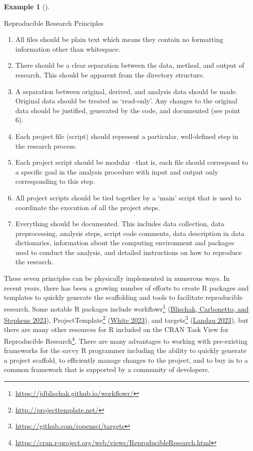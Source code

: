 \documentclass[
  letterpaper,
  DIV=11,
  numbers=noendperiod]{scrreport}
\providecommand{\tightlist}{%
  \setlength{\itemsep}{0pt}\setlength{\parskip}{0pt}}\usepackage{longtable,booktabs,array}
\theoremstyle{definition}
\newtheorem{example}{Example}[chapter]
\theoremstyle{remark}
\DeclareRobustCommand{\href}[2]{#2\footnote{\url{#1}}}
\begin{document}
\begin{example}[]\protect\hypertarget{exm-fr-repro-principles}{}\label{exm-fr-repro-principles}

Reproducible Research Principles

\begin{enumerate}
\def\labelenumi{\arabic{enumi}.}
\tightlist
\item
  All files should be plain text which means they contain no formatting
  information other than whitespace.
\item
  There should be a clear separation between the data, method, and
  output of research. This should be apparent from the directory
  structure.
\item
  A separation between original, derived, and analysis data should be
  made. Original data should be treated as `read-only'. Any changes to
  the original data should be justified, generated by the code, and
  documented (see point 6).
\item
  Each project file (script) should represent a particular, well-defined
  step in the research process.
\item
  Each project script should be modular --that is, each file should
  correspond to a specific goal in the analysis procedure with input and
  output only corresponding to this step.
\item
  All project scripts should be tied together by a `main' script that is
  used to coordinate the execution of all the project steps.
\item
  Everything should be documented. This includes data collection, data
  preprocessing, analysis steps, script code comments, data description
  in data dictionaries, information about the computing environment and
  packages used to conduct the analysis, and detailed instructions on
  how to reproduce the research.
\end{enumerate}

\end{example}

These seven principles can be physically implemented in numerous ways.
In recent years, there has been a growing number of efforts to create R
packages and templates to quickly generate the scaffolding and tools to
facilitate reproducible research. Some notable R packages include
\href{https://jdblischak.github.io/workflowr/}{workflowr}
(\protect\hyperlink{ref-R-workflowr}{Blischak, Carbonetto, and Stephens
2023}), \href{http://projecttemplate.net/}{ProjectTemplate}
(\protect\hyperlink{ref-R-ProjectTemplate}{White 2023}), and
\href{https://github.com/ropensci/targets}{targets}
(\protect\hyperlink{ref-R-targets}{Landau 2023}), but there are many
other resources for R included on the
\href{https://cran.r-project.org/web/views/ReproducibleResearch.html}{CRAN
Task View for Reproducible Research}. There are many advantages to
working with pre-existing frameworks for the savvy R programmer
including the ability to quickly generate a project scaffold, to
efficiently manage changes to the project, and to buy in to a common
framework that is supported by a community of developers.
\end{document}
